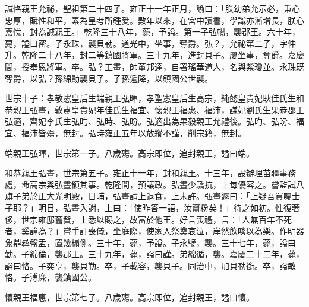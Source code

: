 \begin{pinyinscope}
諴恪親王允祕，聖祖第二十四子。雍正十一年正月，諭曰：「朕幼弟允示必，秉心忠厚，賦性和平，素為皇考所鍾愛。數年以來，在宮中讀書，學識亦漸增長，朕心嘉悅，封為諴親王。」乾隆三十八年，薨，予謚。第一子弘暢，襲郡王。六十年，薨，謚曰密。子永珠，襲貝勒。道光中，坐事，奪爵。弘？，允祕第二子，字仲升。乾隆二十八年，封二等鎮國將軍。三十九年，進封貝子。屢坐事，奪爵。嘉慶間，授奉恩將軍。卒。弘？工畫，師董邦達，自署瑤華道人，名與紫瓊並。永珠既奪爵，以弘？孫綿勛襲貝子。子孫遞降，以鎮國公世襲。

世宗十子：孝敬憲皇后生端親王弘暉，孝聖憲皇后生高宗，純懿皇貴妃耿佳氏生和恭親王弘晝，敦肅皇貴妃年佳氏生福宜、懷親王福惠、福沛，謙妃劉氏生果恭郡王弘適，齊妃李氏生弘昀、弘時、弘昐。弘適出為果毅親王允禮後。弘昀、弘昐、福宜、福沛皆殤，無封。弘時雍正五年以放縱不謹，削宗籍，無封。

端親王弘暉，世宗第一子。八歲殤。高宗即位，追封親王，謚曰端。

和恭親王弘晝，世宗第五子。雍正十一年，封和親王。十三年，設辦理苗疆事務處，命高宗與弘晝領其事。乾隆間，預議政。弘晝少驕抗，上每優容之。嘗監試八旗子弟於正大光明殿，日晡，弘晝請上退食，上未許。弘晝遽曰：「上疑吾買囑士子耶？」明日，弘晝入謝，上曰：「使昨答一語，汝齏粉矣！」待之如初。性復奢侈，世宗雍邸舊貲，上悉以賜之，故富於他王。好言喪禮，言：「人無百年不死者，奚諱為？」嘗手訂喪儀，坐庭際，使家人祭奠哀泣，岸然飲啖以為樂。作明器象鼎彞盤盂，置幾榻側。三十年，薨，予謚。子永璧，襲。三十七年，薨，謚曰勤。子綿倫，襲郡王。三十九年，薨，謚曰謹。弟綿循，襲。嘉慶二十二年，薨，謚曰恪。子奕亨，襲貝勒。卒，子載容，襲貝子。同治中，加貝勒銜。卒，謚敏恪。子溥廉，襲鎮國公。

懷親王福惠，世宗第七子。八歲殤。高宗即位，追封親王，謚曰懷。


\end{pinyinscope}